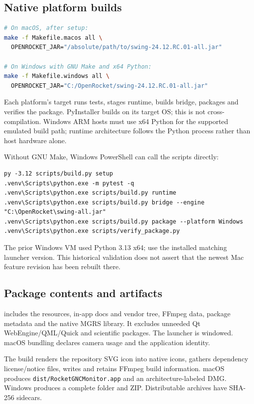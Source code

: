 \subsection{Native platform builds}
\begin{lstlisting}[language=bash]
# On macOS, after setup:
make -f Makefile.macos all \
  OPENROCKET_JAR="/absolute/path/to/swing-24.12.RC.01-all.jar"

# On Windows with GNU Make and x64 Python:
make -f Makefile.windows all \
  OPENROCKET_JAR="C:/OpenRocket/swing-24.12.RC.01-all.jar"
\end{lstlisting}
Each platform's \code{all} target runs tests, stages runtime, builds bridge,
packages and verifies the package. PyInstaller builds on its target OS; this is
not cross-compilation. Windows ARM hosts must use x64 Python for the supported
emulated build path; runtime architecture follows the Python process rather
than host hardware alone.

Without GNU Make, Windows PowerShell can call the scripts directly:
\begin{lstlisting}
py -3.12 scripts/build.py setup
.venv\Scripts\python.exe -m pytest -q
.venv\Scripts\python.exe scripts/build.py runtime
.venv\Scripts\python.exe scripts/build.py bridge --engine "C:\OpenRocket\swing-all.jar"
.venv\Scripts\python.exe scripts/build.py package --platform Windows
.venv\Scripts\python.exe scripts/verify_package.py
\end{lstlisting}
The prior Windows VM used Python 3.13 x64; use the installed matching launcher
version. This historical validation does not assert that the newest Mac feature
revision has been rebuilt there.

\subsection{Package contents and artifacts}
 includes the resources, in-app docs and vendor
tree, FFmpeg data, package metadata and the native MGRS library. It excludes
unneeded Qt WebEngine/QML/Quick and scientific packages. The launcher is
windowed. macOS bundling declares camera usage and the application identity.

The build renders the repository SVG icon into native icons, gathers dependency
license/notice files, writes  and retains
FFmpeg build information. macOS produces
\nolinkurl{dist/RocketGNCMonitor.app} and an architecture-labeled DMG. Windows produces
a complete \code{dist/RocketGNCMonitor} folder and ZIP. Distributable archives
have SHA-256 sidecars.

